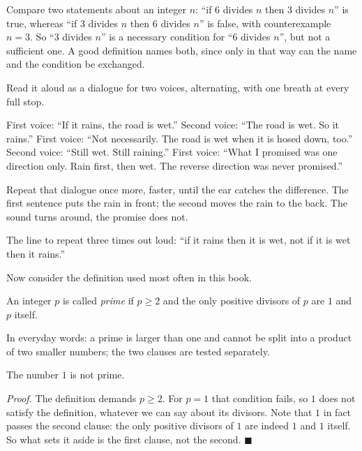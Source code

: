 
Compare two statements about an integer $n$: ``if $6$ divides $n$ then $3$
divides $n$'' is true, whereas ``if $3$ divides $n$ then $6$ divides $n$'' is false,
with counterexample $n=3$. So ``$3$ divides $n$'' is a necessary condition for ``$6$ divides
$n$'', but not a sufficient one. A good definition names both, since only
in that way can the name and the condition be exchanged.

\begin{bacakeras}
Read it aloud as a dialogue for two voices, alternating, with one breath at every full stop.

First voice: ``If it rains, the road is wet.''
Second voice: ``The road is wet. So it rains.''
First voice: ``Not necessarily. The road is wet when it is hosed down, too.''
Second voice: ``Still wet. Still raining.''
First voice: ``What I promised was one direction only. Rain first, then wet. The reverse direction was never promised.''

Repeat that dialogue once more, faster, until the ear catches the difference. The first
sentence puts the rain in front; the second moves the rain to the back. The sound turns
around, the promise does not.

The line to repeat three times out loud: ``if it rains then it is wet, not if
it is wet then it rains.''
\end{bacakeras}

Now consider the definition used most often in this book.

\begin{definisi}
An integer $p$ is called \emph{prime} if $p \geq 2$ and the only positive divisors
of $p$ are $1$ and $p$ itself.
\end{definisi}

In everyday words: a prime is larger than one and cannot be split
into a product of two smaller numbers; the two clauses are tested separately.

\begin{proposisi}
The number $1$ is not prime.
\end{proposisi}
\par\smallskip\noindent\textit{Proof.} The definition demands $p \geq 2$. For $p = 1$
that condition fails, so $1$ does not satisfy the definition, whatever we can
say about its divisors. Note that $1$ in fact passes the second clause:
the only positive divisors of $1$ are indeed $1$ and $1$ itself. So what sets it aside
is the first clause, not the second.
\hfill$\blacksquare${\parfillskip=0pt\par}

